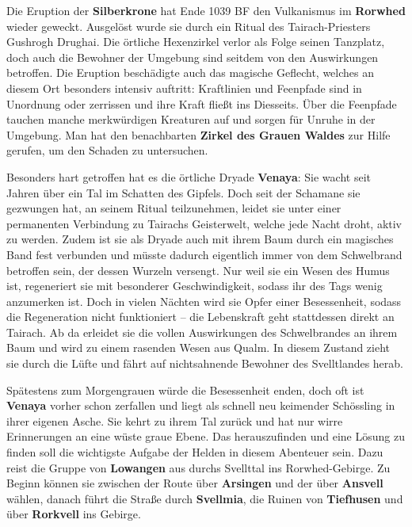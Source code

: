 \spaltenanfang



Die Eruption der \textbf{Silberkrone} hat Ende 1039 BF den Vulkanismus im \textbf{Rorwhed} wieder geweckt.
Ausgelöst wurde sie durch ein Ritual des Tairach-Priesters Gushrogh Drughai.
Die örtliche Hexenzirkel verlor als Folge seinen Tanzplatz, doch auch die Bewohner der Umgebung sind seitdem von den Auswirkungen betroffen.
Die Eruption beschädigte auch das magische Geflecht, welches an diesem Ort besonders intensiv auftritt:
Kraftlinien und Feenpfade sind in Unordnung oder zerrissen und ihre Kraft fließt ins Diesseits.
Über die Feenpfade tauchen manche merkwürdigen Kreaturen auf und sorgen für Unruhe in der Umgebung.
Man hat den benachbarten \textbf{Zirkel des Grauen Waldes} zur Hilfe gerufen, um den Schaden zu untersuchen.

Besonders hart getroffen hat es die örtliche Dryade \textbf{Venaya}:
Sie wacht seit Jahren über ein Tal im Schatten des Gipfels.
Doch seit der Schamane sie gezwungen hat, an seinem Ritual teilzunehmen, leidet sie unter einer permanenten Verbindung zu Tairachs Geisterwelt, welche jede Nacht droht, aktiv zu werden.
Zudem ist sie als Dryade auch mit ihrem Baum durch ein magisches Band fest verbunden und müsste dadurch eigentlich immer von dem Schwelbrand betroffen sein, der dessen Wurzeln versengt.
Nur weil sie ein Wesen des Humus ist, regeneriert sie mit besonderer Geschwindigkeit, sodass ihr des Tags wenig anzumerken ist.
Doch in vielen Nächten wird sie Opfer einer Besessenheit, sodass die Regeneration nicht funktioniert -- die Lebenskraft geht stattdessen direkt an Tairach.
Ab da erleidet sie die vollen Auswirkungen des Schwelbrandes an ihrem Baum und wird zu einem rasenden Wesen aus Qualm.
In diesem Zustand zieht sie durch die Lüfte und fährt auf nichtsahnende Bewohner des Svelltlandes herab.


Spätestens zum Morgengrauen würde die Besessenheit enden, doch oft ist \textbf{Venaya} vorher schon zerfallen und liegt als schnell neu keimender Schössling in ihrer eigenen Asche.
Sie kehrt zu ihrem Tal zurück und hat nur wirre Erinnerungen an eine wüste graue Ebene.
Das herauszufinden und eine Lösung zu finden soll die wichtigste Aufgabe der Helden in diesem Abenteuer sein.
Dazu reist die Gruppe von \textbf{Lowangen} aus durchs Svellttal ins Rorwhed-Gebirge.
Zu Beginn können sie zwischen der Route über \textbf{Arsingen} und der über \textbf{Ansvell} wählen, danach führt die Straße durch \textbf{Svellmia}, die Ruinen von \textbf{Tiefhusen} und über \textbf{Rorkvell} ins Gebirge.

